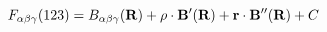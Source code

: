 \begin{equation}                      
F_{\alpha \beta \gamma}(123) = B_{\alpha \beta \gamma} ({\bf R}) +                      
{\bf \rho} \cdot {\bf B}'({\bf R}) + {\bf r} \cdot {\bf B}''({\bf R}) + C                      
\label{eq:fat}                      
\end{equation} 
